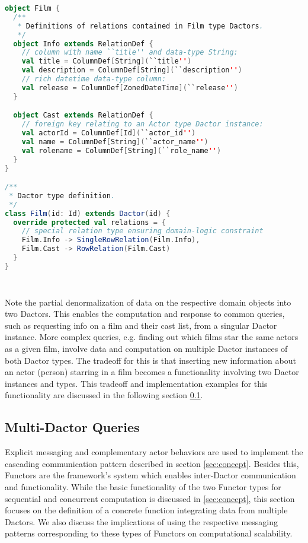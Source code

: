 \begin{lstlisting}[caption=Film Dactor type definition using the actordb framework, label=lst:film_definition, language=Scala]
object Film {
  /**
   * Definitions of relations contained in Film type Dactors.
   */
  object Info extends RelationDef {
    // column with name ``title'' and data-type String:
    val title = ColumnDef[String](``title'')
    val description = ColumnDef[String](``description'')
    // rich datetime data-type column:
    val release = ColumnDef[ZonedDateTime](``release'')
  }

  object Cast extends RelationDef {
    // foreign key relating to an Actor type Dactor instance:
    val actorId = ColumnDef[Id](``actor_id'')
    val name = ColumnDef[String](``actor_name'')
    val rolename = ColumnDef[String](``role_name'')
  }
} 

/**
 * Dactor type definition.
 */
class Film(id: Id) extends Dactor(id) {
  override protected val relations = {
    // special relation type ensuring domain-logic constraint
    Film.Info -> SingleRowRelation(Film.Info),
    Film.Cast -> RowRelation(Film.Cast)
  }
}
\end{lstlisting}

\begin{lstlisting}[caption=Actor Dactor type definition using the actordb framework, label=lst:actor_definition, language=Scala]
  
\end{lstlisting}

Note the partial denormalization of data on the respective domain objects into two Dactors.
This enables the computation and response to common queries, such as requesting info on a film and their cast list, from a singular Dactor instance.
More complex queries, e.g. finding out which films star the same actors as a given film, involve data and computation on multiple Dactor instances of both Dactor types.
The tradeoff for this is that inserting new information about an actor (person) starring in a film becomes a functionality involving two Dactor instances and types.
This tradeoff and implementation examples for this functionality are discussed in the following section \ref{subsec:multi_dactor_queries}.

\subsection{Multi-Dactor Queries}\label{subsec:multi_dactor_queries}

Explicit messaging and complementary actor behaviors are used to implement the cascading communication pattern described in section \ref{sec:concept}.
Besides this, Functors are the framework's system which enables inter-Dactor communication and functionality.
While the basic functionality of the two Functor types for sequential and concurrent computation is discussed in \ref{sec:concept}, this section focuses on the definition of a concrete function integrating data from multiple Dactors.
We also discuss the implications of using the respective messaging patterns corresponding to these types of Functors on computational scalability.

